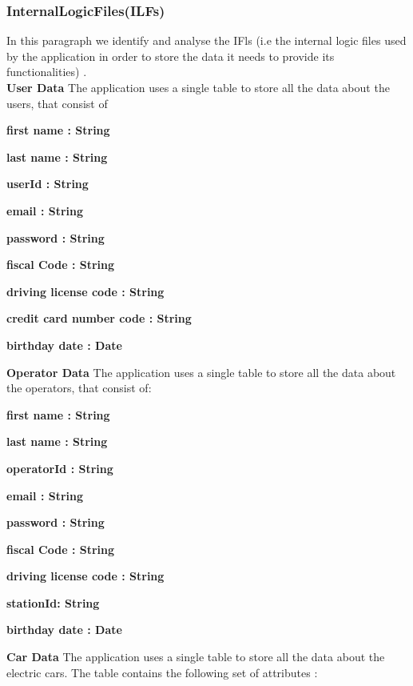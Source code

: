 \documentclass{article}
\begin{document}
\begin{flushleft}
\subsubsection{InternalLogicFiles(ILFs)}  %
In this paragraph we identify and analyse the IFls (i.e the internal logic files used by the application in order to store the data it needs to provide its functionalities) .\\
\vspace{0.5cm}
\textbf{User Data}
The application uses a single table to store  all the data about the users, that consist of \\
\begin{description}
\item\textbf{first name : String} 
\item \textbf{last name : String}     
\item \textbf{userId : String} 
\item \textbf{email : String} 
\item \textbf{password : String} 
\item \textbf{fiscal Code : String} 
\item \textbf{driving license code : String}
\item \textbf{credit card number code : String}
\item \textbf{birthday date : Date}
\end{description}

\vspace{0.5cm}

\textbf{Operator Data}
The application uses a single table to store all the data about the operators, that consist of:
\begin{description}
\item\textbf{first name : String} 
\item \textbf{last name : String}     
\item \textbf{operatorId : String} 
\item \textbf{email : String} 
\item \textbf{password : String} 
\item \textbf{fiscal Code : String} 
\item \textbf{driving license code : String}
\item \textbf{stationId: String}

\item \textbf{birthday date : Date}
\end{description}


\vspace{0.5cm}
\newpage
\textbf{Car Data}\break
The application uses a single table to store all the data about the electric cars.  The table contains the following set of attributes : \\


\end{flushleft}
\end{document}
